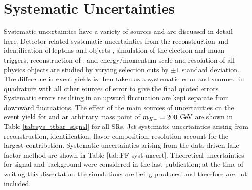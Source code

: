 	\section{Systematic Uncertainties}\label{sec:systs}
		Systematic uncertainties have a variety of sources and are discussed in detail here. Detector-related systematic uncertainties from the reconstruction and identification of leptons and \tauhad objects \cite{tau-calibration}, simulation of the electron and muon triggers, reconstruction of \Etm, and energy/momentum scale and resolution of all physics objects \cites{tau-calibration}{jet-calibration}{egamma-calibration}{met-perf}{muon-calibration} are studied by varying selection cuts by $\pm 1$ standard deviation. The difference in event yields is then taken as a systematic error and summed in quadrature with all other sources of error to give the final quoted errors. Systematic errors resulting in an upward fluctuation are kept separate from downward fluctuations. The effect of the main sources of uncertainties on the event yield for \ttbar and an arbitrary mass point of $m_{H^{\pm}}=200$ GeV are shown in Table \ref{tab:sys_ttbar_signal} for all \glspl{SR}. Jet systematic uncertainties arising from reconstruction, identification, flavor composition, resolution account for the largest contribution. Systematic uncertainties arising from the data-driven fake factor method are shown in Table \ref{tab:FF-syst-uncert}. Theoretical uncertainties for signal and \ttbar background were considered in the last publication; at the time of writing this dissertation the simulations are being produced and therefore are not included. 
		
